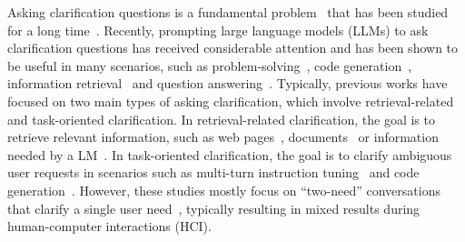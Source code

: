 \label{sec:introduction}
Asking clarification questions is a fundamental problem~\citep{clarify_survey,proactive_survey} that has been studied for a long time~\citep{taylor:2023,clarify_question_for_retrieval}.
Recently, prompting large language models (LLMs) to ask clarification questions has received considerable attention and has been shown to be useful in many scenarios, such as problem-solving~\citep{proactive_cot,rethink_rephrase}, code generation~\citep{clarifygpt}, information retrieval~\citep{clarinet} and question answering~\citep{inscit,star_gate,learn_to_clarify}.
Typically, previous works have focused on two main types of asking clarification, which involve retrieval-related and task-oriented clarification.
In retrieval-related clarification, the goal is to retrieve relevant information, such as web pages~\citep{clarinet}, documents~\citep{multiturn_clarification} or information needed by a LM~\citep{inscit,star_gate,learn_to_clarify}.
In task-oriented clarification, the goal is to clarify ambiguous user requests in scenarios such as multi-turn instruction tuning~\citep{proactive_cot} and code generation~\citep{clarifygpt,treewalker}.
However, these studies mostly focus on ``two-need'' conversations that clarify a single user need~\citep{selective,abg_coqa,mixed_initiative_dialogue}, typically resulting in mixed results during human-computer interactions (HCI).

